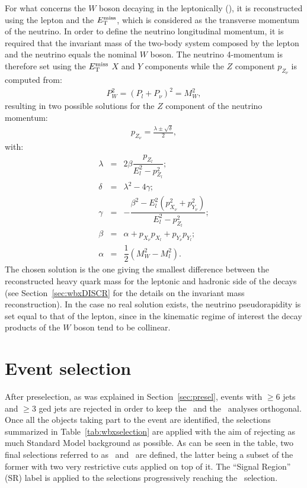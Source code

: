 For what concerns the $W$ boson decaying in the leptonically (\wlep),
it is reconstructed using the lepton and the $\met$, 
which is considered as the transverse momentum of the neutrino. 
In order to define the neutrino longitudinal momentum, it is required that
the invariant mass of the two-body system composed by the lepton and the neutrino 
equals the nominal $W$ boson. 
The neutrino 4-momentum is therefore set using the $\met$ $X$ and $Y$ components
while the $Z$ component $p_{Z_\nu}$ is computed from: 
\begin{eqnarray}
P_W^2 = (P_l + P_{\nu})^2 = M_W^2,
\end{eqnarray}
resulting in two possible solutions for the 
$Z$ component of the neutrino momentum:
\begin{eqnarray}
p_{Z_\nu} = \frac{\lambda \pm \sqrt{\delta} }{2},
\end{eqnarray}
with:
\begin{eqnarray}
\lambda &=& 2\beta \dfrac{p_{Z_l}}{E_l^2-p_{Z_l}^2};\\
\delta  &=& \lambda^2 - 4\gamma;\\
\gamma &=& -\dfrac{\beta^2 - E_l^2 (p_{X_\nu}^2+p_{Y_\nu}^2)}{E_l^2-p_{Z_l}^2}; \\
\beta  &=& \alpha + p_{X_\nu}p_{X_l} + p_{Y_\nu}p_{Y_l}; \\
\alpha &=& \dfrac{1}{2}(M_W^2 - M_l^2).
\end{eqnarray}
The chosen solution is the one giving
the smallest difference between the reconstructed 
heavy quark mass for the
leptonic and hadronic side of the decays (see Section~\ref{sec:wbxDISCR} 
for the details on the invariant mass reconstruction).
In the case no real solution exists, the neutrino pseudorapidity 
is set equal to that of the lepton, since in the kinematic regime of interest  
the decay products of the $W$ boson tend to be collinear.


\section{Event selection}\label{sec:wbxEVT}

After preselection, as was explained in Section~\ref{sec:presel},
events with $\geq$6 jets and $\geq$3 \btag ged jets are rejected in order to
keep the \wbx\ and the \htx\ analyses orthogonal.
Once all the objects taking part to the event are identified,
the selections summarized in Table~\ref{tab:wbxselection} are
applied with the aim of rejecting as much Standard Model background
as possible. As can be seen in the table, two final selections referred to as
\loose\ and \tight\ are defined, the latter being a
subset of the former with two very restrictive cuts applied on top of it.
The ``Signal Region'' (SR) label is applied to the selections
progressively reaching the \tight\ selection.

